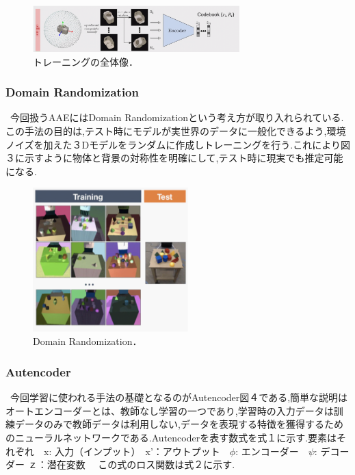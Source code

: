 \documentclass[11pt,a4j,ascmac]{jarticle}
\begin{document}
      \begin{figure}[htpp]
      \centering
      \includegraphics[width=80mm]{pic2.eps}
      \vspace*{40mm}
      \caption{トレーニングの全体像．}
      \label{fig:2d_pose_estimation}
      \end{figure}





\subsubsection{Domain Randomization}
\ 今回扱うAAEにはDomain Randomizationという考え方が取り入れられている.この手法の目的は,テスト時にモデルが実世界のデータに一般化できるよう,環境ノイズを加えた３Dモデルをランダムに作成しトレーニングを行う.これにより図３に示すように物体と背景の対称性を明確にして,テスト時に現実でも推定可能になる.
    \begin{figure}[htpp]
     \centering
      \includegraphics[width=60mm]{pic3.eps}
      \vspace*{30mm}
      \caption{Domain Randomization．}
      \label{fig:2d_pose_estimation}
      \end{figure}







\subsubsection{Autencoder}

\  今回学習に使われる手法の基礎となるのがAutencoder図４である,簡単な説明はオートエンコーダーとは、教師なし学習の一つであり,学習時の入力データは訓練データのみで教師データは利用しない,データを表現する特徴を獲得するためのニューラルネットワークである.Autencoderを表す数式を式１に示す.要素はそれぞれ　x: 入力（インプット）　x’：アウトプット　$\phi$: エンコーダー　$\psi$: デコーダー  ｚ：潜在変数　 この式のロス関数は式２に示す.
\end{document}
